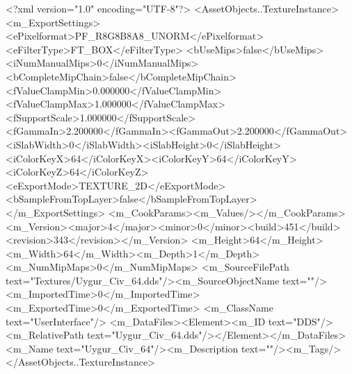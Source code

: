 <?xml version="1.0" encoding="UTF-8"?>
<AssetObjects..TextureInstance>
  <m_ExportSettings>
    <ePixelformat>PF_R8G8B8A8_UNORM</ePixelformat><eFilterType>FT_BOX</eFilterType>
    <bUseMips>false</bUseMips><iNumManualMips>0</iNumManualMips><bCompleteMipChain>false</bCompleteMipChain>
    <fValueClampMin>0.000000</fValueClampMin><fValueClampMax>1.000000</fValueClampMax><fSupportScale>1.000000</fSupportScale>
    <fGammaIn>2.200000</fGammaIn><fGammaOut>2.200000</fGammaOut><iSlabWidth>0</iSlabWidth><iSlabHeight>0</iSlabHeight>
    <iColorKeyX>64</iColorKeyX><iColorKeyY>64</iColorKeyY><iColorKeyZ>64</iColorKeyZ>
    <eExportMode>TEXTURE_2D</eExportMode><bSampleFromTopLayer>false</bSampleFromTopLayer>
  </m_ExportSettings>
  <m_CookParams><m_Values/></m_CookParams>
  <m_Version><major>4</major><minor>0</minor><build>451</build><revision>343</revision></m_Version>
  <m_Height>64</m_Height><m_Width>64</m_Width><m_Depth>1</m_Depth><m_NumMipMaps>0</m_NumMipMaps>
  <m_SourceFilePath text="Textures/Uygur_Civ_64.dds"/><m_SourceObjectName text=""/>
  <m_ImportedTime>0</m_ImportedTime><m_ExportedTime>0</m_ExportedTime>
  <m_ClassName text="UserInterface"/>
  <m_DataFiles><Element><m_ID text="DDS"/><m_RelativePath text="Uygur_Civ_64.dds"/></Element></m_DataFiles>
  <m_Name text="Uygur_Civ_64"/><m_Description text=""/><m_Tags/>
</AssetObjects..TextureInstance>
